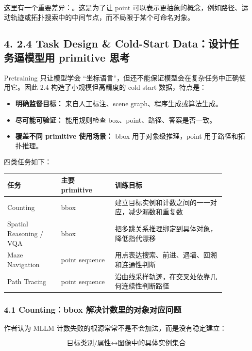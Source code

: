 这里有一个重要差异：。这是为了让 point 可以表示更抽象的概念，例如路径、运动轨迹或拓扑搜索中的中间节点，而不局限于某个可命名对象。

\subsection{4. 2.4 Task Design \& Cold-Start Data：设计任务逼模型用 primitive 思考}

Pretraining 只让模型学会 ``坐标语言''，但还不能保证模型会在复杂任务中正确使用它。因此 2.4 构造了小规模但高精度的 cold-start 数据，特点是：

\begin{itemize}[leftmargin=1.5em]
  \item \textbf{明确监督目标：} 来自人工标注、scene graph、程序生成或算法生成。
  \item \textbf{尽可能可验证：} 能用规则检查 box、point、路径、答案是否一致。
  \item \textbf{覆盖不同 primitive 使用场景：} bbox 用于对象级推理，point 用于路径和拓扑推理。
\end{itemize}

四类任务如下：

\begin{center}
\small
\setlength{\tabcolsep}{4pt}
\begin{tabular}{p{0.22\linewidth}p{0.22\linewidth}p{0.45\linewidth}}
\toprule
\textbf{任务} & \textbf{主要 primitive} & \textbf{训练目标} \\
\midrule
Counting & bbox & 建立目标实例和计数之间的一一对应，减少漏数和重复数 \\
Spatial Reasoning / VQA & bbox & 把多跳关系推理绑定到具体对象，降低指代漂移 \\
Maze Navigation & point sequence & 用点表达搜索、前进、遇墙、回溯和连通性判断 \\
Path Tracing & point sequence & 沿曲线采样轨迹，在交叉处依靠几何连续性判断路径 \\
\bottomrule
\end{tabular}
\end{center}

\subsubsection{4.1 Counting：bbox 解决计数里的对象对应问题}

作者认为 MLLM 计数失败的根源常常不是不会加法，而是没有稳定建立：

\[
\text{目标类别/属性} \longleftrightarrow \text{图像中的具体实例集合}
\]

